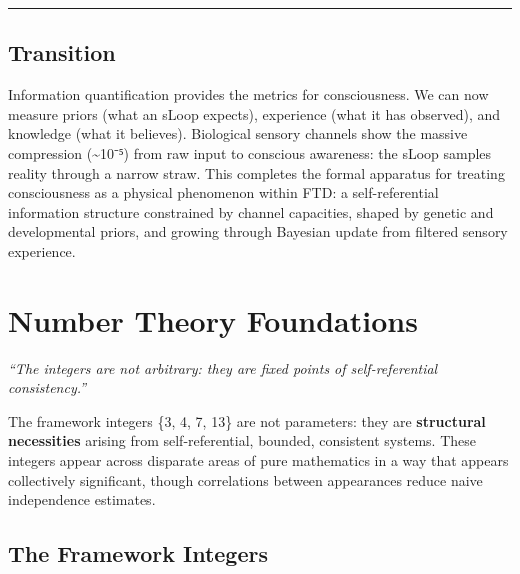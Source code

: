 \documentclass[
  11pt,
  letterpaper,
  twoside,
  openright]{book}
\begin{document}
\begin{center}\rule{0.5\linewidth}{0.5pt}\end{center}

\section{Transition}\label{transition-46}

Information quantification provides the metrics for consciousness. We
can now measure priors (what an sLoop expects), experience (what it has
observed), and knowledge (what it believes). Biological sensory channels
show the massive compression (\textasciitilde10⁻⁵) from raw input to
conscious awareness: the sLoop samples reality through a narrow straw.
This completes the formal apparatus for treating consciousness as a
physical phenomenon within FTD: a self-referential information structure
constrained by channel capacities, shaped by genetic and developmental
priors, and growing through Bayesian update from filtered sensory
experience.

\chapter{Number Theory Foundations}\label{sec-number-theory}

\emph{``The integers are not arbitrary: they are fixed points of
self-referential consistency.''}

\begin{tcolorbox}[enhanced jigsaw, coltitle=black, colbacktitle=quarto-callout-important-color!10!white, toprule=.15mm, colframe=quarto-callout-important-color-frame, arc=.35mm, opacityback=0, bottomtitle=1mm, toptitle=1mm, breakable, colback=white, titlerule=0mm, opacitybacktitle=0.6, title=\textcolor{quarto-callout-important-color}{\faExclamation}\hspace{0.5em}{Deep Mathematical Structure}, rightrule=.15mm, bottomrule=.15mm, leftrule=.75mm, left=2mm]

The framework integers \{3, 4, 7, 13\} are not parameters: they are
\textbf{structural necessities} arising from self-referential, bounded,
consistent systems. These integers appear across disparate areas of pure
mathematics in a way that appears collectively significant, though
correlations between appearances reduce naive independence estimates.

\end{tcolorbox}

\section{The Framework Integers}\label{the-framework-integers}
\end{document}
